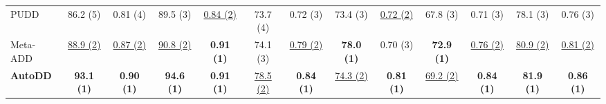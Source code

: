 \documentclass[conference]{IEEEtran}
\begin{document}
\begin{table}[p]
{\begin{tabular}{|l|c|c|c|c|c|c|c|c|c|c|c|c|}
PUDD & 86.2 (5) & 0.81 (4) & 89.5 (3) & \underline{0.84 (2)} & 73.7 (4) & 0.72 (3) & 73.4 (3) & \underline{0.72 (2)} & 67.8 (3) & 0.71 (3) & 78.1 (3) & 0.76 (3) \\
Meta-ADD & \underline{88.9 (2)} & \underline{0.87 (2)} & \underline{90.8 (2)} & \textbf{0.91 (1)} & 74.1 (3) & \underline{0.79 (2)} & \textbf{78.0 (1)} & 0.70 (3) & \textbf{72.9 (1)} & \underline{0.76 (2)} & \underline{80.9 (2)} & \underline{0.81 (2)} \\
\textbf{AutoDD} & \textbf{93.1 (1)} & \textbf{0.90 (1)} & \textbf{94.6 (1)} & \textbf{0.91 (1)} & \underline{78.5 (2)} & \textbf{0.84 (1)} & \underline{74.3 (2)} & \textbf{0.81 (1)} & \underline{69.2 (2)} & \textbf{0.84 (1)} & \textbf{81.9 (1)} & \textbf{0.86 (1)} \\
\hline
\end{tabular}
}

\vspace{1em}


\end{table}
\end{document}
